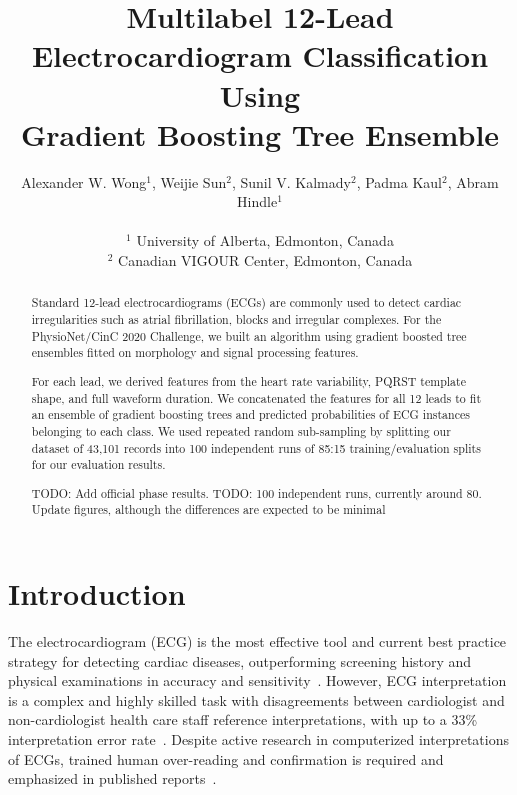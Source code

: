 \documentclass[twocolumn]{cinc}
\begin{document}


\title{Multilabel 12-Lead Electrocardiogram Classification Using \\
Gradient Boosting Tree Ensemble}

\author {Alexander W. Wong$^{1}$, Weijie Sun$^{2}$, Sunil V. Kalmady$^{2}$, Padma Kaul$^{2}$, Abram Hindle$^{1}$\\
\ \\
 $^1$ University of Alberta, Edmonton, Canada \\
$^2$ Canadian VIGOUR Center, Edmonton, Canada }

\maketitle

\begin{abstract}

Standard 12-lead electrocardiograms (ECGs) are commonly used to detect cardiac irregularities such as atrial fibrillation, blocks and irregular complexes.
For the PhysioNet/CinC 2020 Challenge, we built an algorithm using gradient boosted tree ensembles fitted on morphology and signal processing features.

For each lead, we derived features from the heart rate variability, PQRST template shape, and full waveform duration.
We concatenated the features for all 12 leads to fit an ensemble of gradient boosting trees and predicted probabilities of ECG instances belonging to each class.
We used repeated random sub-sampling by splitting our dataset of 43,101 records into 100 independent runs of 85:15 training/evaluation splits for our evaluation results.

TODO: Add official phase results.
TODO: 100 independent runs, currently around 80. Update figures, although the differences are expected to be minimal


\end{abstract}

\section{Introduction}

The electrocardiogram (ECG) is the most effective tool and current best practice strategy for detecting cardiac diseases, outperforming screening history and physical examinations in accuracy and sensitivity~\cite{harmon_effectiveness_2015}.
However, ECG interpretation is a complex and highly skilled task with disagreements between cardiologist and non-cardiologist health care staff reference interpretations, with up to a 33\% interpretation error rate~\cite{mele_improving_2008}.
Despite active research in computerized interpretations of ECGs, trained human over-reading and confirmation is required and emphasized in published reports~\cite{schlapfer_computer-interpreted_2017}.
\end{document}
